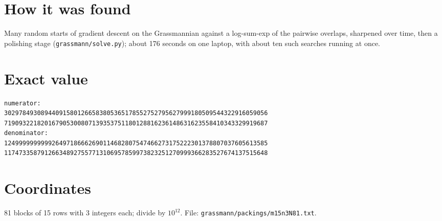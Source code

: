 \documentclass[11pt,a4paper]{article}
\begin{document}
\section{How it was found}
Many random starts of gradient descent on the Grassmannian against a log-sum-exp of the pairwise overlaps, sharpened over time, then a polishing stage (\texttt{grassmann/solve.py}); about 176 seconds on one laptop, with about ten such searches running at once.


\appendix
\section{Exact value}
{\small
\begin{verbatim}
numerator:
302978493089440915801266583805365178552752795627999180509544322916059056
719093221820167905300807139353751180128816236148631623558410343329919687
denominator:
124999999999926497186662690114682807547466273175222301378807037605613585
117473358791266348927557713106957859973823251270999366283527674137515648
\end{verbatim}}

\section{Coordinates}
81 blocks of 15 rows with 3 integers each; divide by $10^{12}$. File: \texttt{grassmann/packings/m15n3N81.txt}.
{\tiny
\begin{multicols}{3}
\end{multicols}}
\end{document}
